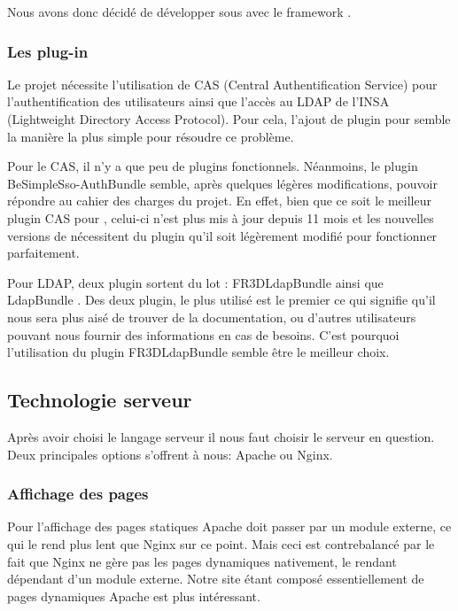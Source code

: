 \medbreak

Nous avons donc décidé de développer sous \php avec le framework \symfony.

\subsubsection{Les plug-in \symfony}

Le projet nécessite l'utilisation de CAS (Central Authentification Service) pour l'authentification des utilisateurs ainsi que l'accès au LDAP de l'INSA (Lightweight Directory Access Protocol). Pour cela, l'ajout de plugin pour \symfony semble la manière la plus simple pour résoudre ce problème.

Pour le CAS, il n'y a que peu de plugins \symfony fonctionnels. Néanmoins, le plugin \og BeSimpleSso-AuthBundle \fg semble, après quelques légères modifications, pouvoir répondre au cahier des charges du projet. En effet, bien que ce soit le meilleur plugin CAS pour \symfony, celui-ci n'est plus mis à jour depuis 11 mois et les nouvelles versions de \symfony nécessitent du plugin qu'il soit légèrement modifié pour fonctionner parfaitement.

Pour LDAP, deux plugin sortent du lot : \og FR3DLdapBundle \fg ainsi que \og LdapBundle \fg. Des deux plugin, le plus utilisé est le premier ce qui signifie qu'il nous sera plus aisé de trouver de la documentation, ou d’autres utilisateurs pouvant nous fournir des informations en cas de besoins. C'est pourquoi l'utilisation du plugin \og FR3DLdapBundle \fg semble être le meilleur choix.

\subsection{Technologie serveur}

Après avoir choisi le langage serveur il nous faut choisir le serveur en question. Deux principales options s'offrent à nous: Apache ou Nginx.

\subsubsection{Affichage des pages}
Pour l'affichage des pages statiques Apache doit passer par un module externe, ce qui le rend plus lent que Nginx sur ce point.
Mais ceci est contrebalancé par le fait que Nginx ne gère pas les pages dynamiques nativement, le rendant dépendant d'un module externe.
Notre site étant composé essentiellement de pages dynamiques Apache est plus intéressant.

